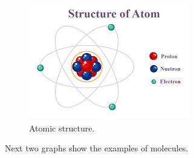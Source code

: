 \begin{figure}[!htb]
    \centering
    \includegraphics[width=0.9\linewidth]{Figures/Theory/atom.png}
    \caption{Atomic structure.}
    \label{figure:atom}
\end{figure}

Next two graphs show the examples of molecules.

